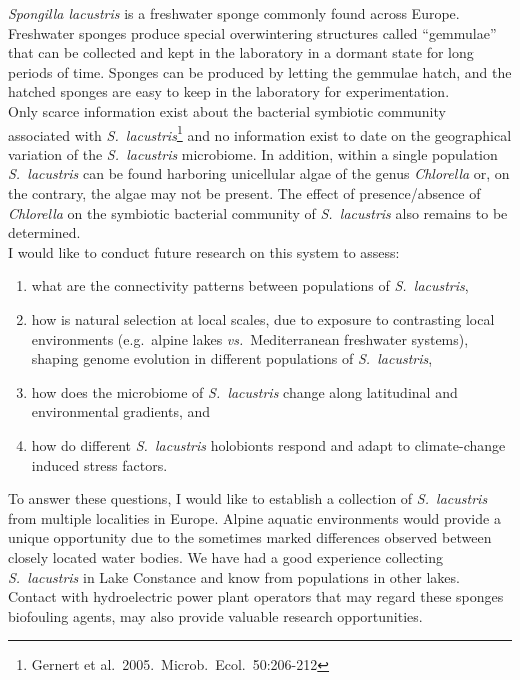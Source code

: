 \documentclass[a4paper,11pt]{article}
\begin{document}
\emph{Spongilla lacustris} is a freshwater sponge commonly found across Europe. Freshwater sponges produce special overwintering structures called ``gemmulae'' that can be collected and kept in the laboratory in a dormant state for long periods of time. Sponges can be produced by letting the gemmulae hatch, and the hatched sponges are easy to keep in the laboratory for experimentation.\\

Only scarce information exist about the bacterial symbiotic community associated with \emph{S.~lacustris}\footnote{Gernert et al.~2005.~Microb.~Ecol.~50:206-212} and no information exist to date on the geographical variation of the \emph{S.~lacustris} microbiome. In addition, within a single population \emph{S.~lacustris} can be found harboring unicellular algae of the genus \emph{Chlorella} or, on the contrary, the algae may not be present. The effect of presence/absence of \emph{Chlorella} on the symbiotic bacterial community of \emph{S.~lacustris} also remains to be determined. \\

I would like to conduct future research on this system to assess:
\begin{enumerate}
\item what are the connectivity patterns between populations of \emph{S.~lacustris},
\item how is natural selection at local scales, due to exposure to contrasting local environments (e.g.~alpine lakes \emph{vs.}~Mediterranean freshwater systems), shaping genome evolution in different populations of \emph{S.~lacustris},
\item how does the microbiome of \emph{S.~lacustris} change along latitudinal and environmental gradients, and
\item how do different \emph{S.~lacustris} holobionts respond and adapt to climate-change induced stress factors.
\end{enumerate}

To answer these questions, I would like to establish a collection of \emph{S.~lacustris} from multiple localities in Europe. Alpine aquatic environments would provide a unique opportunity due to the sometimes marked differences observed between closely located water bodies. We have had a good experience collecting \emph{S.~lacustris} in Lake Constance and know from populations in other lakes. Contact with hydroelectric power plant operators that may regard these sponges biofouling agents, may also provide valuable research opportunities. \\
\end{document}
